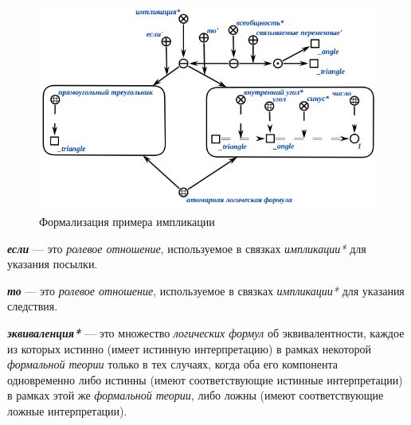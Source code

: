 \begin{figure}[http]
	\includegraphics[scale=0.8]{author/part2/figures/logic/implication_triangle.png}
	\caption{Формализация примера импликации}
	\label{fig:implication_triangle}
\end{figure}

\begin{SCn}
\scnsubset{1\scnrolesign}
\end{SCn}

\textbf{\textit{если\scnrolesign}} --- это \textit{ролевое отношение}, используемое в связках \textit{импликации*} для указания посылки.

\begin{SCn}
\scnsubset{2\scnrolesign}
\end{SCn}

\textbf{\textit{то\scnrolesign}} --- это \textit{ролевое отношение}, используемое в связках \textit{импликации*} для указания следствия.

\begin{SCn}
\end{SCn}

\textbf{\textit{эквиваленция*}} --- это множество \textit{логических формул} об эквивалентности, каждое из которых истинно (имеет истинную интерпретацию) в рамках некоторой \textit{формальной теории} только в тех случаях, когда оба его компонента одновременно либо истинны (имеют соответствующие истинные интерпретации) в рамках этой же \textit{формальной теории}, либо ложны (имеют соответствующие ложные интерпретации).

